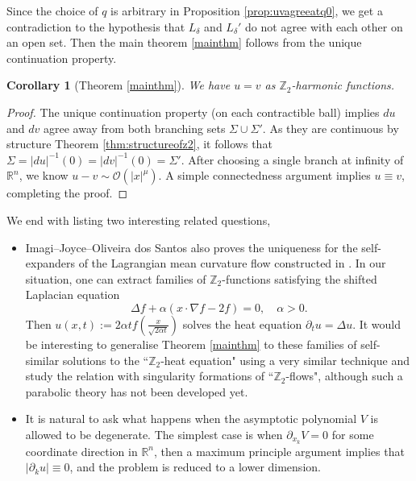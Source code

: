 \documentclass[11pt,a4paper]{article}
\numberwithin{equation}{section}%
\newtheorem{cor}[thm]{Corollary}
\theoremstyle{definition}
\newcommand{\R}{\mathbb{R}}
\newcommand{\Z}{\mathbb{Z}}
\begin{document}
Since the choice of $q$ is arbitrary in Proposition \ref{prop:uvagreeatq0}, we get a contradiction to the hypothesis that $L_\delta $ and $L_\delta'$ do not agree with each other on an open set. Then the main theorem \ref{mainthm} follows from the unique continuation property. 
\begin{cor}[Theorem \ref{mainthm}]
    We have $u=v$ as $\Z_2$-harmonic functions. 
\end{cor}
\begin{proof}
   The unique continuation property (on each contractible ball) implies $du$ and $dv$ agree away from both branching sets $\Sigma\cup \Sigma'$. As they are continuous by structure Theorem \ref{thm:structureofz2}, it follows that 
   $\Sigma=|du|^{-1}(0)=|dv|^{-1}(0)=\Sigma'$. After choosing a single branch at infinity of $\R^n$, we know $u-v \sim  \mathcal{O}(|x|^\mu)$. A simple connectedness argument implies $u \equiv v$, completing the proof.
\end{proof}
We end with listing two interesting related questions,
\begin{itemize}
    \item Imagi--Joyce--Oliveira dos Santos also proves the uniqueness for the self-expanders of the Lagrangian mean curvature flow constructed in \cite{Joyce-Lee-Tsui}. In our situation, one can extract families of $\Z_2$-functions satisfying the shifted Laplacian equation
    $$\Delta f+\alpha(x\cdot\nabla f-2f)=0,\quad \alpha> 0.$$
    Then $u(x,t):=2\alpha tf\left(\frac{x}{\sqrt{2\alpha t}}\right)$ solves the heat equation $\partial_t u=\Delta u$. It would be interesting to generalise Theorem \ref{mainthm} to these families of self-similar solutions to the ``$\Z_2$-heat equation" using a very similar technique and study the relation with singularity formations of ``$\Z_2$-flows", although such a parabolic theory has not been developed yet.
    \item It is natural to ask what happens when the asymptotic polynomial $V$ is allowed to be degenerate. The simplest case is when $\partial_{x_k}V=0$ for some coordinate direction in $\R^n$, then a maximum principle argument implies that $|\partial_k u|\equiv0$, and the problem is reduced to a lower dimension. 
\end{itemize}



\end{document}
